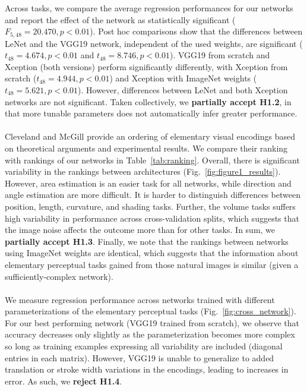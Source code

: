 Across tasks, we compare the average regression performances for our networks and report the effect of the network as statistically significant ($F_{5,48}=20.470,p<0.01$). Post hoc comparisons show that the differences between LeNet and the VGG19 network, independent of the used weights, are significant ($t_48=4.674,p<0.01$ and $t_48=8.746,p<0.01$). VGG19 from scratch and Xception (both versions) perform significantly differently, with Xception from scratch ($t_48=4.944,p<0.01$) and Xception with ImageNet weights ($t_48=5.621,p<0.01$). However, differences between LeNet and both Xception networks are not significant. Taken collectively, we \textbf{partially accept H1.2}, in that more tunable parameters does not automatically infer greater performance.
\\~\\
 Cleveland and McGill provide an ordering of elementary visual encodings based on theoretical arguments and experimental results. We compare their ranking with rankings of our networks in Table~\ref{tab:ranking}. Overall, there is significant variability in the rankings between architectures (Fig.~\ref{fig:figure1_results}). However, area estimation is an easier task for all networks, while direction and angle estimation are more difficult. It is harder to distinguish differences between position, length, curvature, and shading tasks. Further, the volume tasks suffers high variability in performance across cross-validation splits, which suggests that the image noise affects the outcome more than for other tasks. In sum, we \textbf{partially accept H1.3}. Finally, we note that the rankings between networks using ImageNet weights are identical, which suggests that the information about elementary perceptual tasks gained from those natural images is similar (given a sufficiently-complex network).
\\~\\
 We measure regression performance across networks trained with different parameterizations of the elementary perceptual tasks (Fig.~\ref{fig:cross_network}). For our best performing network (VGG19 trained from scratch), we observe that accuracy decreases only slightly as the parameterization becomes more complex so long as training examples expressing all variability are included (diagonal entries in each matrix).  However, VGG19 is unable to generalize to added translation or stroke width variations in the encodings, leading to increases in error. As such, we \textbf{reject H1.4}. 

